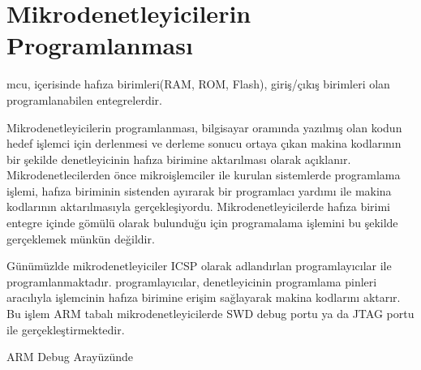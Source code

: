\chapter{Mikrodenetleyicilerin Programlanması}

\acrfull{mcu}, içerisinde hafıza birimleri(RAM, ROM, Flash), giriş/çıkış birimleri olan programlanabilen entegrelerdir.

Mikrodenetleyicilerin programlanması, bilgisayar oramında yazılmış olan kodun hedef işlemci için derlenmesi
ve derleme sonucu ortaya çıkan makina kodlarının bir şekilde denetleyicinin hafıza birimine aktarılması olarak açıklanır.
Mikrodenetlecilerden önce mikroişlemciler ile kurulan sistemlerde programlama işlemi, hafıza biriminin sistenden ayırarak
bir programlacı yardımı ile makina kodlarının aktarılmasıyla gerçekleşiyordu. Mikrodenetleyicilerde hafıza birimi entegre
içinde gömülü olarak bulunduğu için programalama işlemini bu şekilde gerçeklemek münkün değildir.

Günümüzlde mikrodenetleyiciler \acrfull{ICSP} olarak adlandırlan programlayıcılar ile programlanmaktadır.  programlayıcılar,
denetleyicinin programlama pinleri aracılıyla işlemcinin hafıza birimine erişim sağlayarak makina kodlarını aktarır.
Bu işlem ARM tabalı mikrodenetleyicilerde \acrfull{SWD} debug portu ya da JTAG portu ile gerçekleştirmektedir.

ARM Debug Arayüzünde
